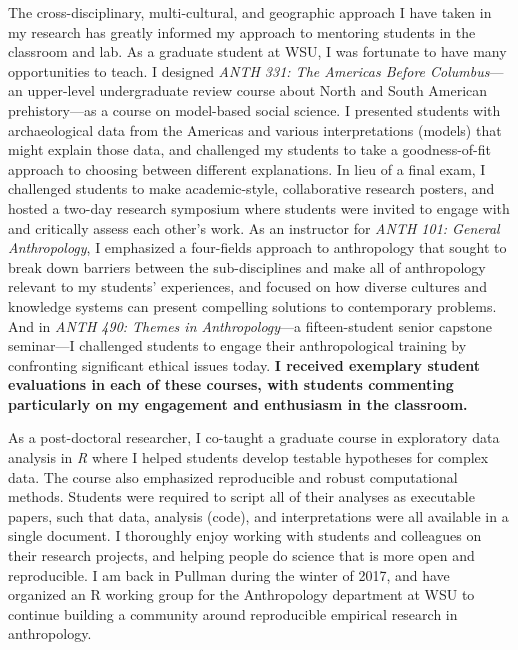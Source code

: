 \documentclass[letterpaper,11pt]{letter}
\begin{document}
\begin{letter}{}
The cross-disciplinary, multi-cultural, and geographic approach I have taken in my research has greatly informed my approach to mentoring students in the classroom and lab. As a graduate student at WSU, I was fortunate to have many opportunities to teach. I designed \emph{ANTH 331: The Americas Before Columbus}---an upper-level undergraduate review course about North and South American prehistory---as a course on model-based social science. I presented students with archaeological data from the Americas and various interpretations (models) that might explain those data, and challenged my students to take a goodness-of-fit approach to choosing between different explanations. In lieu of a final exam, I challenged  students to make academic-style, collaborative research posters, and hosted a two-day research symposium where students were invited to engage with and critically assess each other's work. As an instructor for \emph{ANTH 101: General Anthropology}, I emphasized a four-fields approach to anthropology that sought to break down barriers between the sub-disciplines and make all of anthropology relevant to my students' experiences, and focused on how diverse cultures and knowledge systems can present compelling solutions to contemporary problems. And in \emph{ANTH 490: Themes in Anthropology}---a fifteen-student senior capstone seminar---I challenged students to engage their anthropological training by confronting significant ethical issues today. {\bf I received exemplary student evaluations in each of these courses, with students commenting particularly on my engagement and enthusiasm in the classroom.}

As a post-doctoral researcher, I co-taught a graduate course in exploratory data analysis in \emph{R} where I helped students develop testable hypotheses for complex data. The course also emphasized reproducible and robust computational methods. Students were required to script all of their analyses as executable papers, such that data, analysis (code), and interpretations were all available in a single document. I thoroughly enjoy working with students and colleagues on their research projects, and helping people do science that is more open and reproducible. I am back in Pullman during the winter of 2017, and have organized an R working group for the Anthropology department at WSU to continue building a community around reproducible empirical research in anthropology.


\end{letter}
\end{document}
